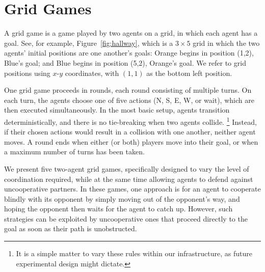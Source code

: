 
\section{Grid Games}
\label{sec:grid_games}

A grid game is a game played by two agents on a grid, in which each
agent has a goal.  See, for example, Figure~\ref{fig:hallway}, which
is a $3\times 5$ grid in which the two agents' initial positions are one
another's goals: Orange begins in position (1,2), Blue's goal; and
Blue begins in position (5,2), Orange's goal.  We refer to grid
positions using $x$-$y$ coordinates, with $(1,1)$ as the bottom left
position.

One grid game proceeds in rounds,
each round consisting of multiple turns.
On each turn, the agents choose one of five actions (N, S, E, W, or wait),
which are then executed simultaneously.  In the most basic setup,
agents transition deterministically, and there is no tie-breaking when
two agents collide.%
\footnote{It is a simple matter to vary these rules within our
  infrastructure, as future experimental design might dictate.}
%
Instead, if their chosen actions would result in a collision with one
another, neither agent moves.  A round ends when either (or both)
players move into their goal, or when a maximum number of turns has
been taken.

We present five two-agent grid games, specifically designed to
vary the level of coordination required, while at the same time allowing agents to defend against uncooperative partners.
%
% 
In these games, one approach is for an agent to cooperate blindly with
its opponent by simply moving out of the opponent's way, and hoping
the opponent then waits for the agent to catch up.  However, such
strategies can be exploited by uncooperative ones that proceed
directly to the goal as soon as their path is unobstructed.
 

